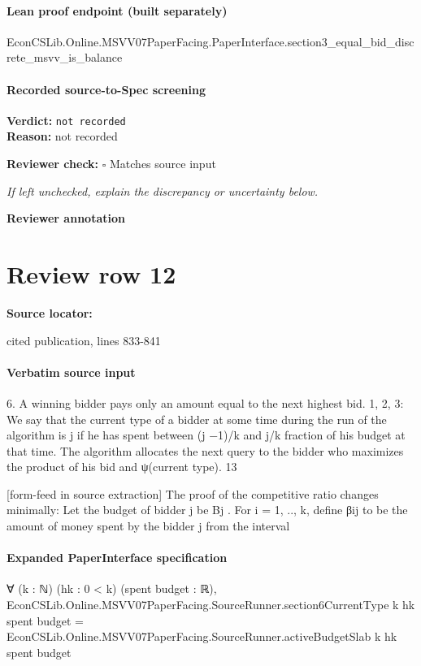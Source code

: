 \documentclass[10pt]{article}
\newcommand{\reviewerbox}{%
  \par\noindent\fbox{\parbox{0.96\linewidth}{\rule{0pt}{0.38in}}}\par
}
\newcommand{\reviewmatch}[1]{%
  \par\noindent\textbf{Reviewer check:} $\square$\; #1\par
  \noindent\emph{If left unchecked, explain the discrepancy or uncertainty below.}\par
}
\begin{document}
\paragraph{Lean proof endpoint (built separately)}\begin{ReviewVerbatim}
EconCSLib.Online.MSVV07PaperFacing.PaperInterface.section3_equal_bid_discrete_msvv_is_balance
\end{ReviewVerbatim}

\paragraph{Recorded source-to-Spec screening}
\textbf{Verdict:} \texttt{not recorded}
\\
\textbf{Reason:} not recorded
\reviewmatch{Matches source input}
\noindent\textbf{Reviewer annotation}\par
\reviewerbox
\clearpage
\hypertarget{source-claim-8897af29d98791bc}{}
\section*{Review row 12}
\textbf{Source locator:} {\footnotesize\raggedright cited publication, lines 833-\allowbreak{}841\par}
\paragraph{Verbatim source input}
\begin{ReviewVerbatim}
6. A winning bidder pays only an amount equal to the next highest bid.
1, 2, 3: We say that the current type of a bidder at some time during the run of the algorithm
is j if he has spent between (j −1)/k and j/k fraction of his budget at that time. The algorithm
allocates the next query to the bidder who maximizes the product of his bid and ψ(current
type).
13


[form-feed in source extraction]
The proof of the competitive ratio changes minimally: Let the budget of bidder j be Bj . For
i = 1, .., k, define βij to be the amount of money spent by the bidder j from the interval
\end{ReviewVerbatim}


\paragraph{Expanded PaperInterface specification}
\begin{ReviewVerbatim}
∀ (k : ℕ) (hk : 0 < k) (spent budget : ℝ),
  EconCSLib.Online.MSVV07PaperFacing.SourceRunner.section6CurrentType k hk spent budget =
    EconCSLib.Online.MSVV07PaperFacing.SourceRunner.activeBudgetSlab k hk spent budget
\end{ReviewVerbatim}
\end{document}
